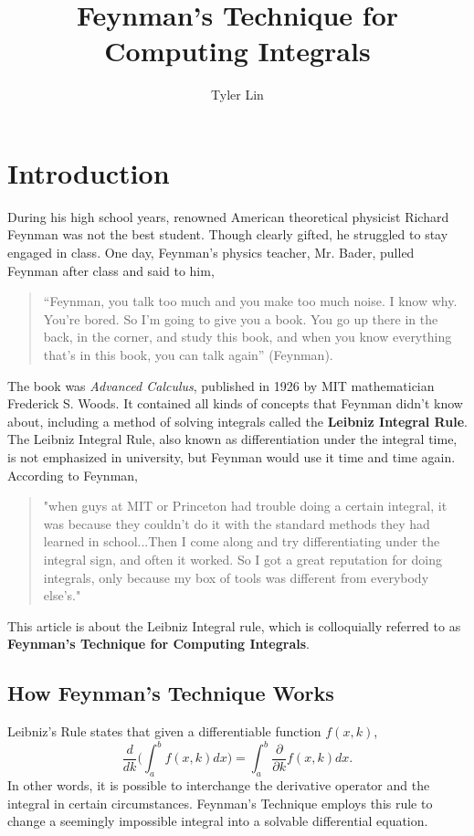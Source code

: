 \documentclass{article}
\title{Feynman's Technique for Computing Integrals}
\author{Tyler Lin}
\begin{document}
\maketitle

\section*{Introduction}
During his high school years, renowned American theoretical physicist Richard Feynman was not the best student. Though clearly gifted, he struggled to stay engaged in class. One day, Feynman's physics teacher, Mr. Bader, pulled Feynman after class and said to him, 
\begin{quote}
    “Feynman, you talk too much and you make too much noise. I know why. You’re bored. So I’m going to give you a book. You go up there in the back, in the corner, and study this book, and when you know everything that’s in this book, you can talk again” (Feynman).
\end{quote}
The book was \textit{Advanced Calculus}, published in 1926 by MIT mathematician Frederick S. Woods. It contained all kinds of concepts that Feynman didn't know about, including a method of solving integrals called the \textbf{Leibniz Integral Rule}. The Leibniz Integral Rule, also known as differentiation under the integral time, is not emphasized in university, but Feynman would use it time and time again. 
\newline \newline According to Feynman, 
\begin{quote}
    "when guys at MIT or Princeton had trouble doing a certain integral, it was because they couldn’t do it with the standard methods they had learned in school...Then I come along and try differentiating under the integral sign, and often it worked. So I got a great reputation for doing integrals, only because my box of tools was different from everybody else’s."
\end{quote}
This article is about the Leibniz Integral rule, which is colloquially referred to as \textbf{Feynman's Technique for Computing Integrals}.
\subsection*{How Feynman's Technique Works}
Leibniz's Rule states that given a differentiable function $f(x,k)$,
$$\frac{d}{dk}\bigg(\int_{a}^{b}f(x,k)dx\bigg)=\int_{a}^{b}\frac{\partial}{\partial k}f(x,k)dx.$$
In other words, it is possible to interchange the derivative operator and the integral in certain circumstances. Feynman's Technique employs this rule to change a seemingly impossible integral into a solvable differential equation.
\end{document}
